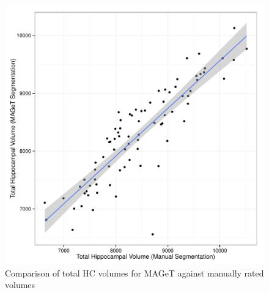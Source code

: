 \documentclass{article}\usepackage{graphicx, color}
\makeatletter
\def\maxwidth{ %
  \ifdim\Gin@nat@width>\linewidth
    \linewidth
  \else
    \Gin@nat@width
  \fi
}
\newenvironment{knitrout}{}{} %
\makeatother
\begin{document}
\begin{figure}[h]
\begin{knitrout}
\color{fgcolor}

{\centering \includegraphics[width=\maxwidth]{figure/SZ_volumes} 

}


\end{knitrout}

  \caption{Comparison of total HC volumes for MAGeT against manually rated volumes}
  \label{SZ_volumes}
\end{figure}
\end{document}
